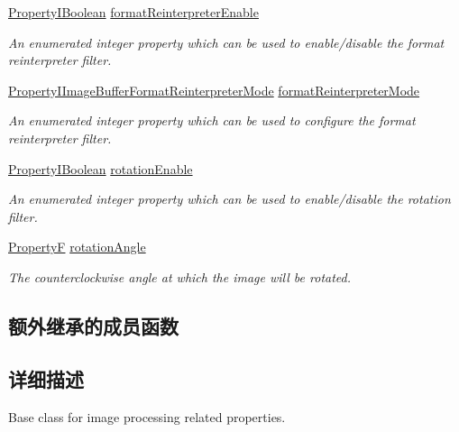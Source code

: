 \begin{DoxyCompactItemize}
\hyperlink{group___common_interface_ga44f9437e24b21b6c93da9039ec6786aa}{Property\+I\+Boolean} \hyperlink{classmv_i_m_p_a_c_t_1_1acquire_1_1_image_processing_a15907d13fa374891738730e7addee017}{format\+Reinterpreter\+Enable}
\begin{DoxyCompactList}\small\item\em An enumerated integer property which can be used to enable/disable the format reinterpreter filter. \end{DoxyCompactList}\item 
\hyperlink{group___common_interface_ga7fd91208d37ae9034d9639d64e0e0e25}{Property\+I\+Image\+Buffer\+Format\+Reinterpreter\+Mode} \hyperlink{classmv_i_m_p_a_c_t_1_1acquire_1_1_image_processing_a9077d1d9e51681a0ae60e9265f5129a8}{format\+Reinterpreter\+Mode}
\begin{DoxyCompactList}\small\item\em An enumerated integer property which can be used to configure the format reinterpreter filter. \end{DoxyCompactList}\item 
\hyperlink{group___common_interface_ga44f9437e24b21b6c93da9039ec6786aa}{Property\+I\+Boolean} \hyperlink{classmv_i_m_p_a_c_t_1_1acquire_1_1_image_processing_af56131c2b74e45d953aa6aa16d0959f8}{rotation\+Enable}
\begin{DoxyCompactList}\small\item\em An enumerated integer property which can be used to enable/disable the rotation filter. \end{DoxyCompactList}\item 
\hyperlink{group___common_interface_gaf54865fe5a3d5cfd15f9a111b40d09f9}{Property\+F} \hyperlink{classmv_i_m_p_a_c_t_1_1acquire_1_1_image_processing_a92070a7aa140d8f1e202df70c4b3fb7c}{rotation\+Angle}
\begin{DoxyCompactList}\small\item\em The counterclockwise angle at which the image will be rotated. \end{DoxyCompactList}\end{DoxyCompactItemize}
\subsection*{额外继承的成员函数}


\subsection{详细描述}
Base class for image processing related properties. 

